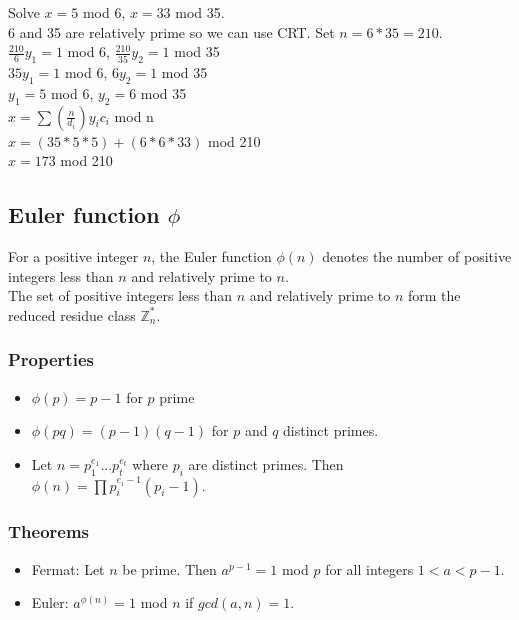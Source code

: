 \documentclass{article}
\begin{document}
Solve $x = 5$ mod 6, $x=33$ mod 35.\\
6 and 35 are relatively prime so we can use CRT. Set $n = 6*35=210$.\\
$\frac{210}{6}y_1 = 1$ mod 6, 
$\frac{210}{35}y_2 = 1$ mod 35\\
$35 y_1 = 1$ mod 6, 
$6 y_2 = 1$ mod 35\\ 
$y_1 = 5$ mod 6, 
$y_2 = 6$ mod 35\\ 
$x = \sum (\frac{n}{d_i})y_i c_i$ mod n\\
$x = (35*5*5)+(6*6*33)$ mod 210\\
$x = 173$ mod 210\\

\subsection{Euler function $\phi$}

For a positive integer $n$, the Euler function $\phi (n)$ denotes the number of positive integers less than $n$ and relatively prime to $n$.\\
The set of positive integers less than $n$ and relatively prime to $n$ form the reduced residue class $\mathbb{Z}^*_n$.

\subsubsection{Properties}

\begin{itemize}
    \item $\phi (p) = p-1$ for $p$ prime
    \item $\phi (pq) = (p-1)(q-1)$ for $p$ and $q$ distinct primes.
    \item Let $n = p_1^{e_1}...p_t^{e_t}$ where $p_i$ are distinct primes. Then $\phi (n) = \prod p_i^{e_i -1} (p_i -1)$.
\end{itemize}

\subsubsection{Theorems}

\begin{itemize}
    \item Fermat: Let $n$ be prime. Then $a^{p-1} = 1$ mod $p$ for all integers $1 < a < p-1$.
    \item Euler: $a^{\phi(n)} = 1$ mod $n$ if $gcd(a,n) = 1$.
\end{itemize}
\end{document}
